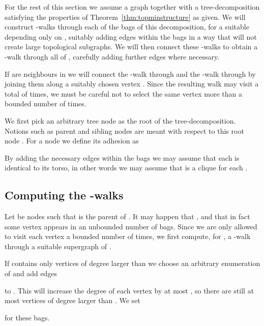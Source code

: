 \documentclass[12pt]{amsart}
\begin{document}
For the rest of this section we assume a graph  together
with a tree-decomposition  satisfying the properties of
Theorem~\ref{thm:topminstructure} as given. We will construct
-walks through each of the bags of this decomposition, for a
suitable  depending only on , suitably adding edges within the
bags in a way that will not create large topological subgraphs. We
will then connect these -walks to obtain a -walk through all of
, carefully adding further edges where necessary.

If  are neighbours in  we will connect the
-walk through  and the -walk through  by
joining them along a suitably chosen vertex . Since the resulting walk may visit  a total of 
times, we must be careful not to select the same vertex  more than
a bounded number of times.

We first pick an arbitrary tree node  as the root of the
tree-decomposition. Notions such as parent and sibling nodes are meant
with respect to this root node . For a node  we define
its adhesion  as

By adding the necessary edges within the bags we may assume that each
 is identical to its torso, in other words we may assume that
 is a clique for each .

\subsection{Computing the -walks }

Let  be nodes such that  is the parent of . It may
happen that , and that in fact
some vertex  appears in an unbounded number of bags. Since we
are only allowed to visit each vertex a bounded number of times, we
first compute, for , a -walk  through a suitable
supergraph of .

If  contains only  vertices of degree larger than 
we choose an arbitrary enumeration  of
 and add edges

to . This will increase the degree of each vertex by at most ,
so there are still at most  vertices of degree larger than
. We set

for these bags.
\end{document}
